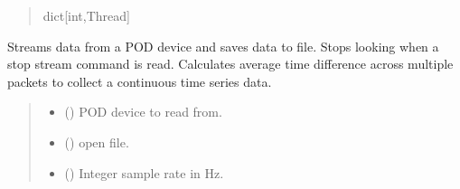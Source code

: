 \documentclass[letterpaper,10pt,english]{sphinxmanual}
\begin{document}
\begin{fulllineitems}
\begin{fulllineitems}
\begin{quote}
\begin{description}
\sphinxAtStartPar
dict{[}int,Thread{]}

\end{description}\end{quote}

\end{fulllineitems}


\begin{fulllineitems}
\label{\detokenize{Setup_8206HR:Setup_8206HR.Setup_8206HR._StreamUntilStop}}
\pysigstartsignatures
{}
\pysigstopsignatures
\sphinxAtStartPar
Streams data from a POD device and saves data to file. Stops looking when a stop stream         command is read. Calculates average time difference across multiple packets to collect a         continuous time series data.
\begin{quote}\begin{description}
\begin{itemize}
\item {} 
\sphinxAtStartPar
{} ({\hyperref[\detokenize{PodDevice_8206HR:PodDevice_8206HR.POD_8206HR}]{}}) \textendash{} POD device to read from.

\item {} 
\sphinxAtStartPar
{} (\sphinxstyleliteralemphasis{\sphinxupquote{ | }}) \textendash{} open file.

\item {} 
\sphinxAtStartPar
{} () \textendash{} Integer sample rate in Hz.


\end{itemize}
\end{description}
\end{quote}
\end{fulllineitems}
\end{fulllineitems}
\end{document}
